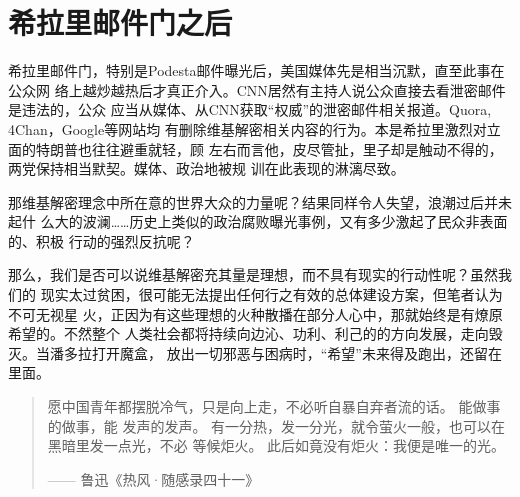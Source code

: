 \section{希拉里邮件门之后}

希拉里邮件门，特别是Podesta邮件曝光后，美国媒体先是相当沉默，直至此事在公众网
络上越炒越热后才真正介入。CNN居然有主持人说公众直接去看泄密邮件是违法的，公众
应当从媒体、从CNN获取“权威”的泄密邮件相关报道。Quora, 4Chan，Google等网站均
有删除维基解密相关内容的行为。本是希拉里激烈对立面的特朗普也往往避重就轻，顾
左右而言他，皮尽管扯，里子却是触动不得的，两党保持相当默契。媒体、政治地被规
训在此表现的淋漓尽致。

那维基解密理念中所在意的世界大众的力量呢？结果同样令人失望，浪潮过后并未起什
么大的波澜……历史上类似的政治腐败曝光事例，又有多少激起了民众非表面的、积极
行动的强烈反抗呢？

那么，我们是否可以说维基解密充其量是理想，而不具有现实的行动性呢？虽然我们的
现实太过贫困，很可能无法提出任何行之有效的总体建设方案，但笔者认为不可无视星
火，正因为有这些理想的火种散播在部分人心中，那就始终是有燎原希望的。不然整个
人类社会都将持续向边沁、功利、利己的的方向发展，走向毁灭。当潘多拉打开魔盒，
放出一切邪恶与困病时，“希望”未来得及跑出，还留在里面。

\begin{quotation}
  愿中国青年都摆脱冷气，只是向上走，不必听自暴自弃者流的话。 能做事的做事，能
  发声的发声。 有一分热，发一分光，就令萤火一般，也可以在黑暗里发一点光，不必
  等候炬火。 此后如竟没有炬火：我便是唯一的光。

  \raggedleft
  —— 鲁迅\quad 《热风·随感录四十一》 \qquad
\end{quotation}
